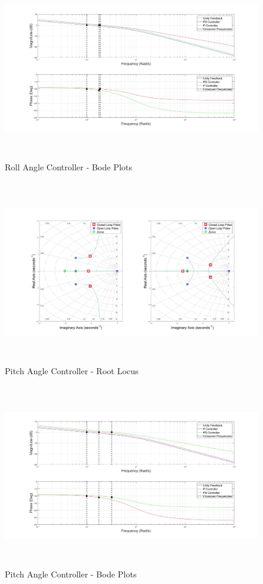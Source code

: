 		\begin{figure}[H]
			\centering
			\includegraphics[height = 8cm]{../Design/Matlab/Controllers/roll_angle_bode.jpg}
			\caption{Roll Angle Controller -  Bode Plots}
			\label{IM_RollAngleControlBode}
		\end{figure}
		
		\begin{figure}[H]
			\centering
			\includegraphics[height = 8cm]{../Design/Matlab/Controllers/pitch_angle_root.jpg}
			\caption{Pitch Angle Controller -  Root Locus}
			\label{IM_PitchAngleControlRoot}
		\end{figure}
		
		\begin{figure}[H]
			\centering
			\includegraphics[height = 8cm]{../Design/Matlab/Controllers/pitch_angle_bode.jpg}
			\caption{Pitch Angle Controller -  Bode Plots}
			\label{IM_PitchAngleControlBode}
		\end{figure}
		

